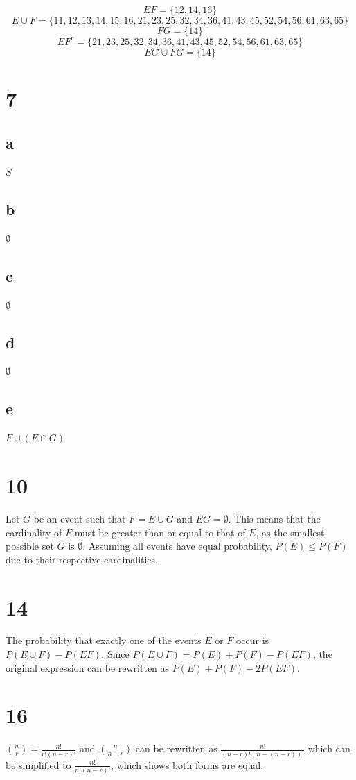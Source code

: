\documentclass[12pt]{article}
\begin{document}
  $$ EF = \{12, 14, 16\} $$
  $$ E \cup F = \{11, 12, 13, 14, 15, 16, 21, 23, 25, 32, 34, 36, 41, 43, 45, 52, 54, 56, 61, 63, 65\} $$
  $$ FG = \{14\} $$
  $$ EF^c = \{21, 23, 25, 32, 34, 36, 41, 43, 45, 52, 54, 56, 61, 63, 65\} $$
  $$ EG \cup FG = \{14\} $$

  \section*{7}
  \subsection*{a}
  $S$
  \subsection*{b}
  $\emptyset$
  \subsection*{c}
  $\emptyset$
  \subsection*{d}
  $\emptyset$
  \subsection*{e}
  $F \cup (E \cap G)$

  \section*{10}
  Let $G$ be an event such that $F = E \cup G$ and $EG = \emptyset$. This means that the cardinality of $F$ must be greater than or equal to that of $E$, as the smallest possible set $G$ is $\emptyset$. Assuming all events have equal probability, $P(E) \leq P(F)$ due to their respective cardinalities.

  \section*{14}
  The probability that exactly one of the events $E$ or $F$ occur is $P(E \cup F) - P(EF)$. Since $P(E \cup F) = P(E) + P(F) - P(EF)$, the original expression can be rewritten as $P(E) + P(F) - 2P(EF)$.

  \section*{16}
  $\binom{n}{r} = \frac{n!}{r!(n-r)!}$ and $\binom{n}{n-r}$ can be rewritten as $\frac{n!}{(n-r)!(n-(n-r))!}$ which can be simplified to $\frac{n!}{n!(n-r)!}$, which shows both forms are equal.
\end{document}
